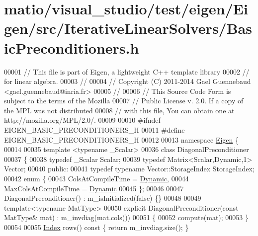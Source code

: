 \hypertarget{matio_2visual__studio_2test_2eigen_2_eigen_2src_2_iterative_linear_solvers_2_basic_preconditioners_8h_source}{}\section{matio/visual\+\_\+studio/test/eigen/\+Eigen/src/\+Iterative\+Linear\+Solvers/\+Basic\+Preconditioners.h}
\label{matio_2visual__studio_2test_2eigen_2_eigen_2src_2_iterative_linear_solvers_2_basic_preconditioners_8h_source}

\begin{DoxyCode}
00001 \textcolor{comment}{// This file is part of Eigen, a lightweight C++ template library}
00002 \textcolor{comment}{// for linear algebra.}
00003 \textcolor{comment}{//}
00004 \textcolor{comment}{// Copyright (C) 2011-2014 Gael Guennebaud <gael.guennebaud@inria.fr>}
00005 \textcolor{comment}{//}
00006 \textcolor{comment}{// This Source Code Form is subject to the terms of the Mozilla}
00007 \textcolor{comment}{// Public License v. 2.0. If a copy of the MPL was not distributed}
00008 \textcolor{comment}{// with this file, You can obtain one at http://mozilla.org/MPL/2.0/.}
00009 
00010 \textcolor{preprocessor}{#ifndef EIGEN\_BASIC\_PRECONDITIONERS\_H}
00011 \textcolor{preprocessor}{#define EIGEN\_BASIC\_PRECONDITIONERS\_H}
00012 
00013 \textcolor{keyword}{namespace }\hyperlink{namespace_eigen}{Eigen} \{ 
00014 
00035 \textcolor{keyword}{template} <\textcolor{keyword}{typename} \_Scalar>
00036 \textcolor{keyword}{class }DiagonalPreconditioner
00037 \{
00038     \textcolor{keyword}{typedef} \_Scalar Scalar;
00039     \textcolor{keyword}{typedef} Matrix<Scalar,Dynamic,1> Vector;
00040   \textcolor{keyword}{public}:
00041     \textcolor{keyword}{typedef} \textcolor{keyword}{typename} Vector::StorageIndex StorageIndex;
00042     \textcolor{keyword}{enum} \{
00043       ColsAtCompileTime = \hyperlink{namespace_eigen_ad81fa7195215a0ce30017dfac309f0b2}{Dynamic},
00044       MaxColsAtCompileTime = \hyperlink{namespace_eigen_ad81fa7195215a0ce30017dfac309f0b2}{Dynamic}
00045     \};
00046 
00047     DiagonalPreconditioner() : m\_isInitialized(false) \{\}
00048 
00049     \textcolor{keyword}{template}<\textcolor{keyword}{typename} MatType>
00050     \textcolor{keyword}{explicit} DiagonalPreconditioner(\textcolor{keyword}{const} MatType& mat) : m\_invdiag(mat.cols())
00051     \{
00052       compute(mat);
00053     \}
00054 
00055     \hyperlink{namespace_eigen_a62e77e0933482dafde8fe197d9a2cfde}{Index} rows()\textcolor{keyword}{ const }\{ \textcolor{keywordflow}{return} m\_invdiag.size(); \}

\end{DoxyCode}
